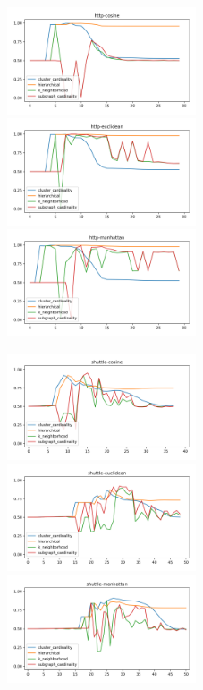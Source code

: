 \begin{figure}[!t]
\centering

\includegraphics[width=2.2in]{kdd/static/auc_vs_depth/http-cosine.png}
\includegraphics[width=2.2in]{kdd/static/auc_vs_depth/http-euclidean.png}
\includegraphics[width=2.2in]{kdd/static/auc_vs_depth/http-manhattan.png}

\includegraphics[width=2.2in]{kdd/static/auc_vs_depth/shuttle-cosine.png}
\includegraphics[width=2.2in]{kdd/static/auc_vs_depth/shuttle-euclidean.png}
\includegraphics[width=2.2in]{kdd/static/auc_vs_depth/shuttle-manhattan.png}


\end{figure}
